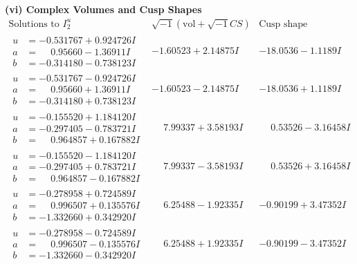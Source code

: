 \documentclass[1p]{elsarticle_modified}
\theoremstyle{definition}
\newcommand{\I}{\sqrt{-1}}
\begin{document}
\newpage\flushleft \textbf{(vi) Complex Volumes and Cusp Shapes}
$$\begin{array}{c|c|c}  
\text{Solutions to }I^u_{2}& \I (\text{vol} + \sqrt{-1}CS) & \text{Cusp shape}\\
 \hline 
\begin{aligned}
u &= -0.531767 + 0.924726 I \\
a &= \phantom{-}0.95660 - 1.36911 I \\
b &= -0.314180 - 0.738123 I\end{aligned}
 & -1.60523 + 2.14875 I & -18.0536 - 1.1189 I \\ \hline\begin{aligned}
u &= -0.531767 - 0.924726 I \\
a &= \phantom{-}0.95660 + 1.36911 I \\
b &= -0.314180 + 0.738123 I\end{aligned}
 & -1.60523 - 2.14875 I & -18.0536 + 1.1189 I \\ \hline\begin{aligned}
u &= -0.155520 + 1.184120 I \\
a &= -0.297405 - 0.783721 I \\
b &= \phantom{-}0.964857 + 0.167882 I\end{aligned}
 & \phantom{-}7.99337 + 3.58193 I & \phantom{-}0.53526 - 3.16458 I \\ \hline\begin{aligned}
u &= -0.155520 - 1.184120 I \\
a &= -0.297405 + 0.783721 I \\
b &= \phantom{-}0.964857 - 0.167882 I\end{aligned}
 & \phantom{-}7.99337 - 3.58193 I & \phantom{-}0.53526 + 3.16458 I \\ \hline\begin{aligned}
u &= -0.278958 + 0.724589 I \\
a &= \phantom{-}0.996507 + 0.135576 I \\
b &= -1.332660 + 0.342920 I\end{aligned}
 & \phantom{-}6.25488 - 1.92335 I & -0.90199 + 3.47352 I \\ \hline\begin{aligned}
u &= -0.278958 - 0.724589 I \\
a &= \phantom{-}0.996507 - 0.135576 I \\
b &= -1.332660 - 0.342920 I\end{aligned}
 & \phantom{-}6.25488 + 1.92335 I & -0.90199 - 3.47352 I \\ \hline\begin{aligned}

\end{aligned}
\end{array}$$
\end{document}
